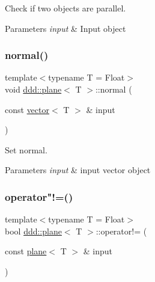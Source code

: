 Check if two objects are parallel. 


\begin{DoxyParams}{Parameters}
{\em input} & Input object \\
\hline
\end{DoxyParams}
\mbox{\label{classddd_1_1plane_a938cb0c882eeb20b1b600bb9f89fb039}} 
\subsubsection{\texorpdfstring{normal()}{normal()}}
{\footnotesize\ttfamily template$<$typename T = Float$>$ \\
void \hyperlink{classddd_1_1plane}{ddd\+::plane}$<$ T $>$\+::normal (\begin{DoxyParamCaption}\item[{const \hyperlink{classddd_1_1vector}{vector}$<$ T $>$ \&}]{input }\end{DoxyParamCaption})\hspace{0.3cm}{\ttfamily [inline]}}



Set normal. 


\begin{DoxyParams}{Parameters}
{\em input} & input vector object \\
\hline
\end{DoxyParams}
\mbox{\label{classddd_1_1plane_a0daa9c3444894627380a1174d3721ca9}} 
\subsubsection{\texorpdfstring{operator"!=()}{operator!=()}}
{\footnotesize\ttfamily template$<$typename T = Float$>$ \\
bool \hyperlink{classddd_1_1plane}{ddd\+::plane}$<$ T $>$\+::operator!= (\begin{DoxyParamCaption}\item[{const \hyperlink{classddd_1_1plane}{plane}$<$ T $>$ \&}]{input }\end{DoxyParamCaption})\hspace{0.3cm}{\ttfamily [inline]}}



